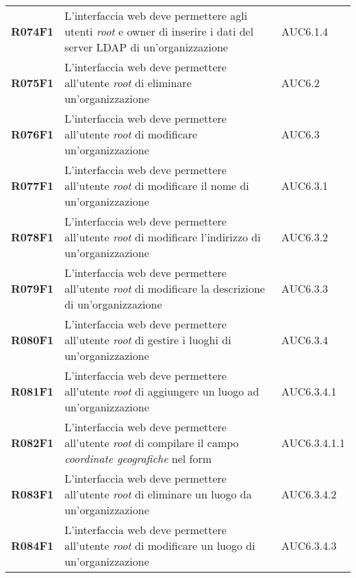 \documentclass[../analisi-dei-requisiti]{subfiles}
\begin{document}
\begin{longtable}[H]{>{\centering\bfseries}m{3cm} >{\centering}m{10cm} >{\centering\arraybackslash}m{3cm}}
  R074F1                  & L'interfaccia web deve permettere agli utenti \textit{root} e owner di inserire i dati del server LDAP di un'organizzazione                    & AUC6.1.4                      \\
  R075F1                  & L'interfaccia web deve permettere all'utente \textit{root} di eliminare un'organizzazione                                                      & AUC6.2                        \\
  R076F1                  & L'interfaccia web deve permettere all'utente \textit{root} di modificare un'organizzazione                                                     & AUC6.3                        \\
  R077F1                  & L'interfaccia web deve permettere all'utente \textit{root} di modificare il nome di un'organizzazione                                          & AUC6.3.1                      \\
  R078F1                  & L'interfaccia web deve permettere all'utente \textit{root} di modificare l'indirizzo di un'organizzazione                                      & AUC6.3.2                      \\
  R079F1                  & L'interfaccia web deve permettere all'utente \textit{root} di modificare la descrizione di un'organizzazione                                   & AUC6.3.3                      \\
  R080F1                  & L'interfaccia web deve permettere all'utente \textit{root} di gestire i luoghi di un'organizzazione                                            & AUC6.3.4                      \\
  R081F1                  & L'interfaccia web deve permettere all'utente \textit{root} di aggiungere un luogo ad un'organizzazione                                         & AUC6.3.4.1                    \\
  R082F1                  & L'interfaccia web deve permettere all'utente \textit{root} di compilare il campo \textit{coordinate geografiche} nel form                      & AUC6.3.4.1.1                  \\
  R083F1                  & L'interfaccia web deve permettere all'utente \textit{root} di eliminare un luogo da un'organizzazione                                          & AUC6.3.4.2                    \\
  R084F1                  & L'interfaccia web deve permettere all'utente \textit{root} di modificare un luogo di un'organizzazione                                         & AUC6.3.4.3                    \\

\end{longtable}
\end{document}
